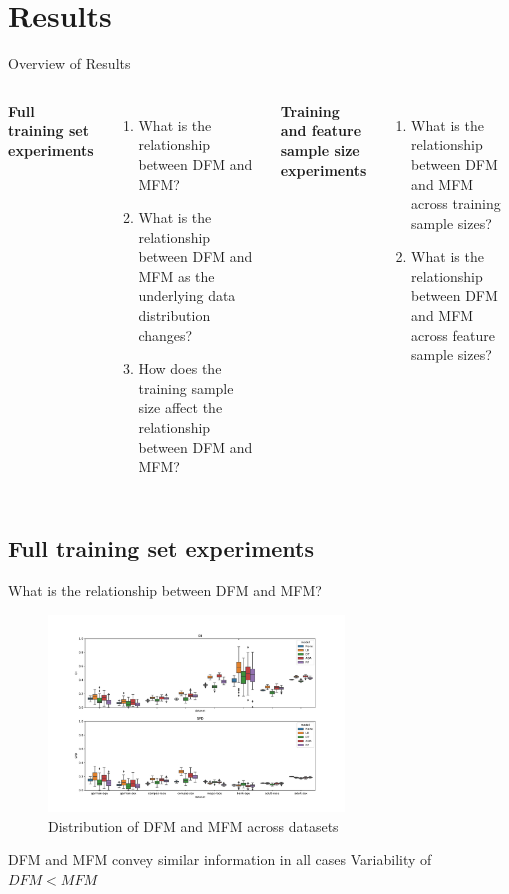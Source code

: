 \documentclass[aspectratio=169]{beamer}
\begin{document}
\section{Results}
\begin{frame}{Overview of Results}
  \begin{columns}[t]
    \begin{center}
      \textbf{Full training set experiments}
    \end{center}
    \begin{enumerate}
    \item What is the relationship between DFM and MFM?
    \item What is the relationship between DFM and MFM as the
      underlying data distribution changes?
    \item How does the training sample size affect the relationship
      between DFM and MFM?
    \end{enumerate}
    \begin{center}
      \textbf{Training and feature sample size experiments}
    \end{center}
    \begin{enumerate}
    \item What is the relationship between DFM and MFM across training
      sample sizes?
    \item What is the relationship between DFM and MFM across
      feature sample sizes?
    \end{enumerate}
  \end{columns}
\end{frame}

\subsection{Full training set experiments}
\begin{frame}{What is the relationship between DFM and MFM?}
  \begin{figure}
    \centering
    \includegraphics[width=0.7\textwidth,height=0.45\textheight]{boxplot--dataset--di-spd--exp-full.pdf}
    \caption{Distribution of DFM and MFM across datasets}
    \label{fig:boxplot--dataset--di-spd--exp-full}
  \end{figure}

  \begin{exampleblock}{DFM and MFM convey similar information in all
    cases}
      Variability of $DFM < MFM$
  \end{exampleblock}
\end{frame}
\end{document}
